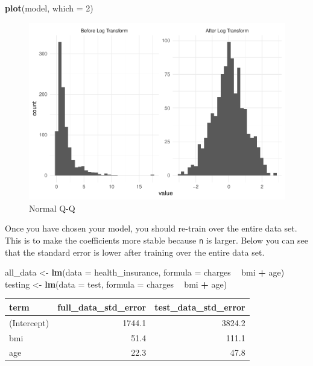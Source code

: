 \documentclass[
  openany]{book}
\newenvironment{Shaded}{\begin{snugshade}}{\end{snugshade}}
\newcommand{\DataTypeTok}[1]{\textcolor[rgb]{0.13,0.29,0.53}{#1}}
\newcommand{\DecValTok}[1]{\textcolor[rgb]{0.00,0.00,0.81}{#1}}
\newcommand{\KeywordTok}[1]{\textcolor[rgb]{0.13,0.29,0.53}{\textbf{#1}}}
\newcommand{\NormalTok}[1]{#1}
\newcommand{\OperatorTok}[1]{\textcolor[rgb]{0.81,0.36,0.00}{\textbf{#1}}}
\newcommand{\StringTok}[1]{\textcolor[rgb]{0.31,0.60,0.02}{#1}}
\begin{document}
\begin{Shaded}
\begin{Highlighting}[]
\KeywordTok{plot}\NormalTok{(model, }\DataTypeTok{which =} \DecValTok{2}\NormalTok{)}
\end{Highlighting}
\end{Shaded}

\begin{figure}
\centering
\includegraphics{05-linear-models_files/figure-latex/unnamed-chunk-13-1.pdf}
\caption{\label{fig:unnamed-chunk-13}Normal Q-Q}
\end{figure}

Once you have chosen your model, you should re-train over the entire data set. This is to make the coefficients more stable because \texttt{n} is larger. Below you can see that the standard error is lower after training over the entire data set.

\begin{Shaded}
\begin{Highlighting}[]
\NormalTok{all_data <-}\StringTok{ }\KeywordTok{lm}\NormalTok{(}\DataTypeTok{data =}\NormalTok{ health_insurance, }
               \DataTypeTok{formula =}\NormalTok{ charges }\OperatorTok{~}\StringTok{ }\NormalTok{bmi }\OperatorTok{+}\StringTok{ }\NormalTok{age)}
\NormalTok{testing <-}\StringTok{ }\KeywordTok{lm}\NormalTok{(}\DataTypeTok{data =}\NormalTok{ test, }
              \DataTypeTok{formula =}\NormalTok{ charges }\OperatorTok{~}\StringTok{ }\NormalTok{bmi }\OperatorTok{+}\StringTok{ }\NormalTok{age)}
\end{Highlighting}
\end{Shaded}

\begin{longtable}[]{@{}lrr@{}}
\toprule
term & full\_data\_std\_error & test\_data\_std\_error\tabularnewline
\midrule
\endhead
(Intercept) & 1744.1 & 3824.2\tabularnewline
bmi & 51.4 & 111.1\tabularnewline
age & 22.3 & 47.8\tabularnewline
\bottomrule
\end{longtable}
\end{document}
